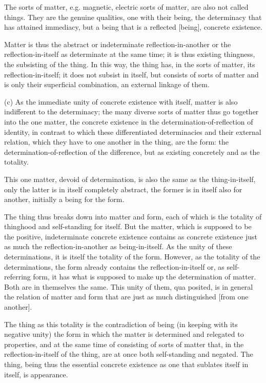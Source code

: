 The sorts of matter, e.g. magnetic, electric sorts of matter, are also
not called things. They are the genuine qualities, one with their being,
the determinacy that has attained immediacy,
but a being that is a reflected [being], concrete existence.

Matter is thus the abstract or indeterminate reflection-in-another or
the reflection-in-itself as determinate at the same time;
it is thus existing thingness, the subsisting of the thing.
In this way, the thing has, in the sorts of matter,
its reflection-in-itself;
it does not subsist in itself, but consists of sorts of matter and
is only their superficial combination, an external linkage of them.

(c) As the immediate unity of concrete existence with itself,
matter is also indifferent to the determinacy;
the many diverse sorts of matter thus go together into
the one matter, the concrete existence in
the determination-of-reflection of identity,
in contrast to which these differentiated determinacies and
their external relation, which they have to one another in the thing,
are the form:
the determination-of-reflection of the difference,
but as existing concretely and as the totality.

This one matter, devoid of determination, is also the same as
the thing-in-itself, only the latter is in itself completely abstract,
the former is in itself also for another, initially a being for the form.

The thing thus breaks down into matter and form,
each of which is the totality of thinghood and
self-standing for itself.
But the matter, which is supposed to be the positive,
indeterminate concrete existence contains as concrete existence
just as much the reflection-in-another as being-in-itself.
As the unity of these determinations,
it is itself the totality of the form.
However, as the totality of the determinations,
the form already contains the reflection-in-itself or,
as self-referring form, it has what is supposed to
make up the determination of matter.
Both are in themselves the same.
This unity of them, qua posited, is in general
the relation of matter and form that are
just as much distinguished [from one another].

The thing as this totality is the contradiction of being
(in keeping with its negative unity)
the form in which the matter is determined and relegated to properties, and
at the same time of consisting of sorts of matter that,
in the reflection-in-itself of the thing, are
at once both self-standing and negated.
The thing, being thus the essential concrete existence
as one that sublates itself in itself, is appearance.

